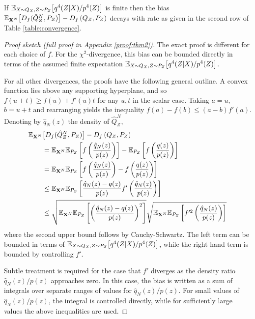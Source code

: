 \begin{theorem}\label{thm:convergence-rate-general}
If $\mathbb{E}_{X\sim Q_X, Z\sim P_Z}\bigl[ q^4(Z|X) / p^4(Z) \bigr]$ is finite then
the bias $\mathbb{E}_{\mathbf{X}^N}\bigl[D_f( \hat{Q}_Z^N , P_Z)\bigr] - D_f\left( Q_{Z} , P_Z\right)$ decays with rate as given in the second row of Table \ref{table:convergence}.
\end{theorem}
\begin{proof}[Proof sketch (full proof in Appendix \ref{proof:thm2})]
The exact proof is different for each choice of $f$.
For the $\chi^2$-divergence, this bias can be bounded directly in terms of the assumed finite expectation $\mathbb{E}_{X\sim Q_X, Z\sim P_Z}\bigl[ q^4(Z|X) / p^4(Z) \bigr]$.

For all other divergences, the proofs have the following general outline.
A convex function lies above any supporting hyperplane, and so $f(u + t) \geq f(u) + f'(u)t$ for any $u,t$ in the scalar case.
Taking $a=u$, $b = u+t$ and rearranging yields the inequality $f(a) - f(b) \leq (a-b) f'(a)$.
Denoting by $\hat{q}_N(z)$ the density of $\hat{Q}_Z^N$,
%
\begin{align*}
\mathbb{E}_{\mathbf{X}^N} & \bigl[D_f( \hat{Q}_Z^N , P_Z)\bigr] - D_f\left( Q_{Z} , P_Z\right) \\
&= \mathbb{E}_{\mathbf{X}^N} \mathbb{E}_{P_Z} \left[ f\left( \frac{\hat{q}_N(z)}{p(z)} \right) \right] - \mathbb{E}_{P_Z} \left[ f\left( \frac{q(z)}{p(z)}\right)\right] \\
&= \mathbb{E}_{\mathbf{X}^N} \mathbb{E}_{P_Z} \left[ f\left( \frac{\hat{q}_N(z)}{p(z)} \right) - f\left( \frac{q(z)}{p(z)}\right)\right] \\
&\leq \mathbb{E}_{\mathbf{X}^N} \mathbb{E}_{P_Z} \left[ \frac{\hat{q}_N(z) - q(z)}{p(z)} f'\left(\frac{\hat{q}_N(z)}{p(z)}\right) \right] \\
&\leq \sqrt{\mathbb{E}_{\mathbf{X}^N} \mathbb{E}_{P_Z} \left[ \left( \frac{\hat{q}_N(z) - q(z)}{p(z)} \right)^2 \right]} \sqrt{\mathbb{E}_{\mathbf{X}^N} \mathbb{E}_{P_Z} \left[ f'^2\left(\frac{\hat{q}_N(z)}{p(z)}\right) \right]}
\end{align*}
%
where the second upper bound follows by Cauchy-Schwartz. 
The left term can be bounded in terms of $\mathbb{E}_{X\sim Q_X, Z\sim P_Z}\bigl[ q^4(Z|X) / p^4(Z) \bigr]$, while the right hand term is bounded by controlling $f'$.

Subtle treatment is required for the case that $f'$ diverges as the density ratio $\hat{q}_N(z)/p(z)$ approaches zero.
In this case, the bias is written as a sum of integrals over separate ranges of values for $\hat{q}_N(z)/p(z)$.
For small values of $\hat{q}_N(z)/p(z)$, the integral is controlled directly, while for sufficiently large values the above inequalities are used.
\end{proof}

